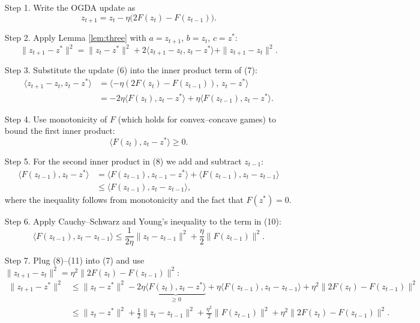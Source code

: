 \documentclass{article}
\begin{document}
\begin{enumerate}
\item[Step 1.] Write the OGDA update as  
\[
z_{t+1}=z_{t}-\eta\bigl(2F(z_{t})-F(z_{t-1})\bigr).
\tag{6}
\]

\item[Step 2.] Apply Lemma \ref{lem:three} with \(a=z_{t+1}\), \(b=z_{t}\), \(c=z^{*}\):
\[
\|z_{t+1}-z^{*}\|^{2}
= \|z_{t}-z^{*}\|^{2}
+2\langle z_{t+1}-z_{t},z_{t}-z^{*}\rangle
+\|z_{t+1}-z_{t}\|^{2}.
\tag{7}
\]

\item[Step 3.] Substitute the update (6) into the inner product term of (7):
\[
\begin{aligned}
\langle z_{t+1}-z_{t},z_{t}-z^{*}\rangle
&= \langle -\eta(2F(z_{t})-F(z_{t-1})),\,z_{t}-z^{*}\rangle\\
&= -2\eta\langle F(z_{t}),z_{t}-z^{*}\rangle
+\eta\langle F(z_{t-1}),z_{t}-z^{*}\rangle.
\end{aligned}
\tag{8}
\]

\item[Step 4.] Use monotonicity of \(F\) (which holds for convex–concave games) to bound the first inner product:
\[
\langle F(z_{t}),z_{t}-z^{*}\rangle \ge 0.
\tag{9}
\]

\item[Step 5.] For the second inner product in (8) we add and subtract \(z_{t-1}\):
\[
\begin{aligned}
\langle F(z_{t-1}),z_{t}-z^{*}\rangle
&=\langle F(z_{t-1}),z_{t-1}-z^{*}\rangle
+\langle F(z_{t-1}),z_{t}-z_{t-1}\rangle\\
&\le \langle F(z_{t-1}),z_{t}-z_{t-1}\rangle,
\end{aligned}
\tag{10}
\]
where the inequality follows from monotonicity and the fact that \(F(z^{*})=0\).

\item[Step 6.] Apply Cauchy–Schwarz and Young’s inequality to the term in (10):
\[
\langle F(z_{t-1}),z_{t}-z_{t-1}\rangle
\le \frac{1}{2\eta}\|z_{t}-z_{t-1}\|^{2}
+\frac{\eta}{2}\|F(z_{t-1})\|^{2}.
\tag{11}
\]

\item[Step 7.] Plug (8)–(11) into (7) and use \(\|z_{t+1}-z_{t}\|^{2}= \eta^{2}\|2F(z_{t})-F(z_{t-1})\|^{2}\):
\[
\begin{aligned}
\|z_{t+1}-z^{*}\|^{2}
&\le \|z_{t}-z^{*}\|^{2}
-2\eta\underbrace{\langle F(z_{t}),z_{t}-z^{*}\rangle}_{\ge0}
+\eta\langle F(z_{t-1}),z_{t}-z_{t-1}\rangle
+\eta^{2}\|2F(z_{t})-F(z_{t-1})\|^{2}\\[1mm]
&\le \|z_{t}-z^{*}\|^{2}
+\frac{1}{2}\|z_{t}-z_{t-1}\|^{2}
+\frac{\eta^{2}}{2}\|F(z_{t-1})\|^{2}
+\eta^{2}\|2F(z_{t})-F(z_{t-1})\|^{2}.
\end{aligned}
\tag{12}
\]


\end{enumerate}
\end{document}
